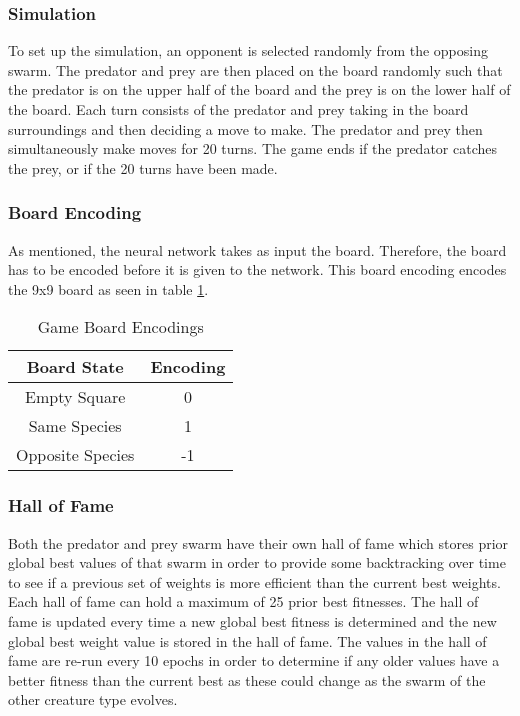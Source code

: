 \subsubsection{Simulation}
To set up the simulation, an opponent is selected randomly from the opposing swarm. The predator and prey are then placed on the board randomly such that the predator is on the upper half of the board and the prey is on the lower half of the board. Each turn consists of the predator and prey taking in the board surroundings and then deciding a move to make. The predator and prey then simultaneously make moves for 20 turns. The game ends if the predator catches the prey, or if the 20 turns have been made. 

\subsubsection{Board Encoding}
As mentioned, the neural network takes as input the board. Therefore, the board has to be encoded before it is given to the network. This board encoding encodes the 9x9 board as seen in table \ref{tab:board-encoding-table}.

\begin{table}
  \centering
  \begin{tabular}{|c|c|}
    \hline
    Board State & Encoding \\
    \hline
    Empty Square & 0 \\
    Same Species & 1 \\
    Opposite Species & -1\\
   \hline
  \end{tabular}
  \caption{Game Board Encodings}
  \label{tab:board-encoding-table}
\end{table}

\subsubsection{Hall of Fame}
Both the predator and prey swarm have their own hall of fame which stores prior global best values of that swarm in order to provide some backtracking over time to see if a previous set of weights is more efficient than the current best weights. Each hall of fame can hold a maximum of 25 prior best fitnesses. The hall of fame is updated every time a new global best fitness is determined and the new global best weight value is stored in the hall of fame. The values in the hall of fame are re-run every 10 epochs in order to determine if any older values have a better fitness than the current best as these could change as the swarm of the other creature type evolves.

